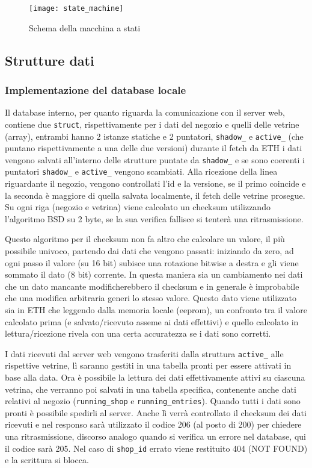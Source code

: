 \begin{figure}[ht]
	\texttt{[image: state\_machine]}
  \caption{Schema della macchina a stati}
\end{figure}

\subsection{Strutture dati}

\subsubsection{Implementazione del database locale}


Il database interno, per quanto riguarda la comunicazione con il server web, contiene due \texttt{struct}, rispettivamente per i dati del negozio e quelli delle vetrine (array), entrambi hanno 2 istanze statiche e 2 puntatori, \texttt{shadow\_} e \texttt{active\_} (che puntano rispettivamente a una delle due versioni) durante il fetch da ETH i dati vengono salvati all'interno delle strutture puntate da \texttt{shadow\_} e se sono coerenti i puntatori \texttt{shadow\_} e \texttt{active\_} vengono scambiati. Alla ricezione della linea riguardante il negozio, vengono controllati l'id e la versione, se il primo coincide e la seconda \`e maggiore di quella salvata localmente, il fetch delle vetrine prosegue. Su ogni riga (negozio e vetrina) viene calcolato un checksum utilizzando l'algoritmo BSD su 2 byte, se la sua verifica fallisce si tenter\`a una ritrasmissione.

Questo algoritmo per il checksum non fa altro che calcolare un valore, il pi\`u possibile univoco, partendo dai dati che vengono passati: iniziando da zero, ad ogni passo il valore (su 16 bit) subisce una rotazione bitwise a destra e gli viene sommato il dato (8 bit) corrente. In questa maniera sia un cambiamento nei dati che un dato mancante modificherebbero il checksum e in generale \`e improbabile che una modifica arbitraria generi lo stesso valore. Questo dato viene utilizzato sia in ETH che leggendo dalla memoria locale (eeprom), un confronto tra il valore calcolato prima (e salvato/ricevuto asseme ai dati effettivi) e quello calcolato in lettura/ricezione rivela con una certa accuratezza se i dati sono corretti.

I dati ricevuti dal server web vengono trasferiti dalla struttura \texttt{active\_} alle rispettive vetrine, l\`i saranno gestiti in una tabella pronti per essere attivati in base alla data. Ora \`e possibile la lettura dei dati effettivamente attivi su ciascuna vetrina, che verranno poi salvati in una tabella specifica, contenente anche dati relativi al negozio (\texttt{running\_shop} e \texttt{running\_entries}). Quando tutti i dati sono pronti \`e possibile spedirli al server. Anche l\`i verr\`a controllato il checksum dei dati ricevuti e nel responso sar\`a utilizzato il codice 206 (al posto di 200) per chiedere una ritrasmissione, discorso analogo quando si verifica un errore nel database, qui il codice sar\`a 205. Nel caso di \texttt{shop\_id} errato viene restituito 404 (NOT FOUND) e la scrittura si blocca.

